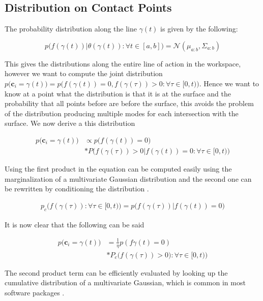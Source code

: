 \documentclass[letterpaper, 10 pt, conference]{ieeeconf}  %
\newcommand{\mN}{\mathcal{N}}
\begin{document}
\subsection{Distribution on Contact Points} The probability distribution along the line $\gamma(t)$ is given by the following:

\begin{equation}
p\big(f(\gamma(t))|\theta(\gamma(t)): \forall t \in [a,b] \big) 
=
\mN(\mu_{a:b},\Sigma_{a:b})
\end{equation}

This gives the distributions along the entire line of action in the workspace, however we want to compute the joint distribution   $p\big(\textbf{c}_i= \gamma(t)\big) = p\big(f(\gamma(t))=0, f(\gamma(\tau))> 0: \forall \tau \in [0,t)\big)$. Hence we want to know at a point what the distribution  is that it is at the surface and the probability that all points before are before the surface, this avoids the problem of the distribution producing multiple modes for each intersection with the surface. We now derive a  this distribution 

\begin{align*}
p\big(\textbf{c}_i = \gamma(t)\big) &\propto p\big(f(\gamma(t)) = 0\big)\\
               &*P\big(f(\gamma(\tau)) > 0 | f(\gamma(t)) = 0: \forall \tau \in [0,t)\big)
\end{align*}

Using the first product in the equation can be computed easily using the marginalization of a multivariate Gaussian distribution and the second one can be rewritten by conditioning the distribution \cite{petersen2008matrix}. 

\begin{align*}
p_c\big(f(\gamma(\tau)): \forall \tau \in [0,t)\big) = p\big(f(\gamma(\tau))  | f(\gamma(t)) = 0\big)  
\end{align*}


It is now clear that the following can be said

\begin{align*}
p\big(\textbf{c}_i = \gamma(t)\big) &= \frac{1}{\eta} p(f\gamma(t) = 0) \\
				   &*P_c\big(f(\gamma(\tau)) > 0): \forall \tau \in [0,t)\big)			 
\end{align*} 

The second product term can be efficiently evaluated by looking up the cumulative distribution of a multivariate Gaussian, which is common in most software packages \cite{matlab}.
\end{document}
